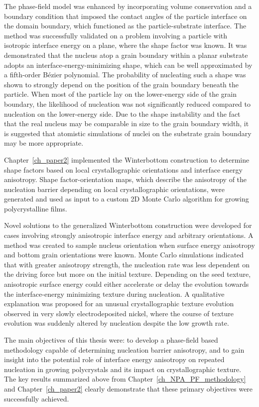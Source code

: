 The phase-field model was enhanced by incorporating volume conservation and a boundary condition that imposed the contact angles of the particle interface on the domain boundary, which functioned as the particle-substrate interface.
The method was successfully validated on a problem involving a particle with isotropic interface energy on a plane, where the shape factor was known.
It was demonstrated that the nucleus atop a grain boundary within a planar substrate adopts an interface-energy-minimizing shape, which can be well approximated by a fifth-order Bézier polynomial.
The probability of nucleating such a shape was shown to strongly depend on the position of the grain boundary beneath the particle. When most of the particle lay on the lower-energy side of the grain boundary, the likelihood of nucleation was not significantly reduced compared to nucleation on the lower-energy side.
Due to the shape instability and the fact that the real nucleus may be comparable in size to the grain boundary width, it is suggested that atomistic simulations of nuclei on the substrate grain boundary may be more appropriate.

Chapter~\ref{ch_paper2} implemented the Winterbottom construction to determine shape factors based on local crystallographic orientations and interface energy anisotropy. Shape factor-orientation maps, which describe the anisotropy of the nucleation barrier depending on local crystallographic orientations, were generated and used as input to a custom 2D Monte Carlo algorithm for growing polycrystalline films.

Novel solutions to the generalized Winterbottom construction were developed for cases involving strongly anisotropic interface energy and arbitrary orientations.
A method was created to sample nucleus orientation when surface energy anisotropy and bottom grain orientations were known.
Monte Carlo simulations indicated that with greater anisotropy strength, the nucleation rate was less dependent on the driving force but more on the initial texture.
Depending on the seed texture, anisotropic surface energy could either accelerate or delay the evolution towards the interface-energy minimizing texture during nucleation.
A qualitative explanation was proposed for an unusual crystallographic texture evolution observed in very slowly electrodeposited nickel, where the course of texture evolution was suddenly altered by nucleation despite the low growth rate.

The main objectives of this thesis were: to develop a phase-field based methodology capable of determining nucleation barrier anisotropy, and to gain insight into the potential role of interface energy anisotropy on repeated nucleation in growing polycrystals and its impact on crystallographic texture. The key results summarized above from Chapter~\ref{ch_NPA_PF_methodology} and Chapter~\ref{ch_paper2} clearly demonstrate that these primary objectives were successfully achieved.


